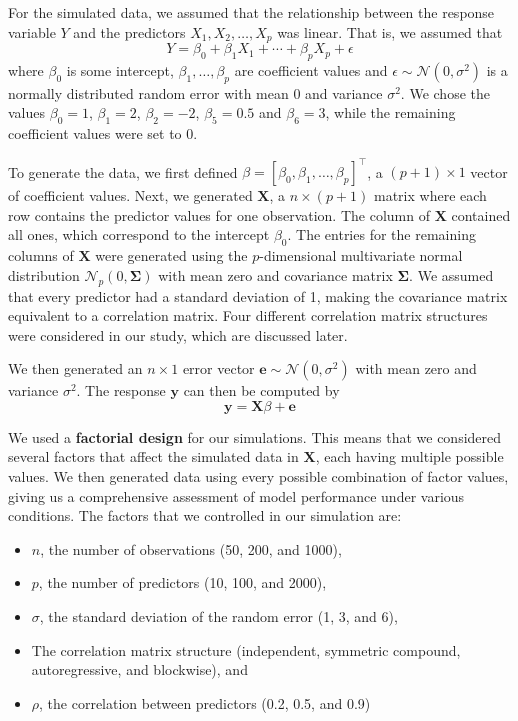 \documentclass{article}
\begin{document}
For the simulated data, we assumed that the relationship between the response variable $Y$ and the predictors $X_1, X_2, \dotsc, X_p$ was linear. That is, we assumed that
\begin{equation}
	Y = \beta_0 + \beta_1 X_1 + \cdots + \beta_p X_p + \epsilon
\end{equation}
where $\beta_0$ is some intercept, $\beta_1, \dotsc, \beta_p$ are coefficient values and $\epsilon\sim \mathcal{N}(0, \sigma^2)$ is a normally distributed random error with mean 0 and variance $\sigma^2$. We chose the values $\beta_0 = 1$, $\beta_1 = 2$, $\beta_2 = -2$, $\beta_5=0.5$ and $\beta_6 = 3$, while the remaining coefficient values were set to 0.

To generate the data, we first defined $\beta = [\beta_0, \beta_1, \dotsc, \beta_p]^\top$, a $(p + 1)\times 1$ vector of coefficient values. Next, we generated $\mathbf{X}$, a $n\times (p + 1)$ matrix where each row contains the predictor values for one observation. The column of $\mathbf{X}$ contained all ones, which correspond to the intercept $\beta_0$. The entries for the remaining columns of $\mathbf{X}$ were generated using the $p$-dimensional multivariate normal distribution $\mathcal{N}_p(0, \mathbf{\Sigma})$ with mean zero and covariance matrix $\mathbf{\Sigma}$. We assumed that every predictor had a standard deviation of 1, making the covariance matrix equivalent to a correlation matrix. Four different correlation matrix structures were considered in our study, which are discussed later.

We then generated an $n\times 1$ error vector $\mathbf{e}\sim \mathcal{N}(0, \sigma^2)$ with mean zero and variance $\sigma^2$. The response $\mathbf{y}$ can then be computed by
\begin{equation}
	\mathbf{y} = \mathbf{X}\beta + \mathbf{e}
\end{equation}

We used a \textbf{factorial design} for our simulations. This means that we considered several factors that affect the simulated data in $\mathbf{X}$, each having multiple possible values. We then generated data using every possible combination of factor values, giving us a comprehensive assessment of model performance under various conditions. The factors that we controlled in our simulation are:
\begin{itemize}
	\item $n$, the number of observations (50, 200, and 1000),
	\item $p$, the number of predictors (10, 100, and 2000),
	\item $\sigma$, the standard deviation of the random error (1, 3, and 6),
	\item The correlation matrix structure (independent, symmetric compound, autoregressive, and blockwise), and
	\item $\rho$, the correlation between predictors (0.2, 0.5, and 0.9)
\end{itemize}
\end{document}
